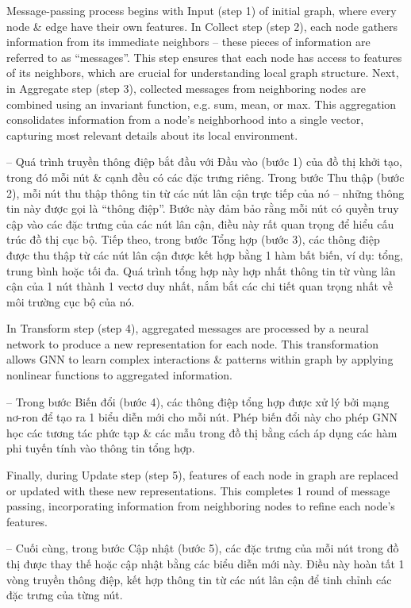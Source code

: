 \documentclass{article}
\begin{document}
\begin{itemize}
\begin{itemize}
\begin{itemize}
            Message-passing process begins with Input (step 1) of initial graph, where every node \& edge have their own features. In Collect step (step 2), each node gathers information from its immediate neighbors -- these pieces of information are referred to as ``messages''. This step ensures that each node has access to features of its neighbors, which are crucial for understanding local graph structure. Next, in Aggregate step (step 3), collected messages from neighboring nodes are combined using an invariant function, e.g. sum, mean, or max. This aggregation consolidates information from a node's neighborhood into a single vector, capturing most relevant details about its local environment.

            -- Quá trình truyền thông điệp bắt đầu với Đầu vào (bước 1) của đồ thị khởi tạo, trong đó mỗi nút \& cạnh đều có các đặc trưng riêng. Trong bước Thu thập (bước 2), mỗi nút thu thập thông tin từ các nút lân cận trực tiếp của nó -- những thông tin này được gọi là ``thông điệp''. Bước này đảm bảo rằng mỗi nút có quyền truy cập vào các đặc trưng của các nút lân cận, điều này rất quan trọng để hiểu cấu trúc đồ thị cục bộ. Tiếp theo, trong bước Tổng hợp (bước 3), các thông điệp được thu thập từ các nút lân cận được kết hợp bằng 1 hàm bất biến, ví dụ: tổng, trung bình hoặc tối đa. Quá trình tổng hợp này hợp nhất thông tin từ vùng lân cận của 1 nút thành 1 vectơ duy nhất, nắm bắt các chi tiết quan trọng nhất về môi trường cục bộ của nó.

            In Transform step (step 4), aggregated messages are processed by a neural network to produce a new representation for each node. This transformation allows GNN to learn complex interactions \& patterns within graph by applying nonlinear functions to aggregated information.

            -- Trong bước Biến đổi (bước 4), các thông điệp tổng hợp được xử lý bởi mạng nơ-ron để tạo ra 1 biểu diễn mới cho mỗi nút. Phép biến đổi này cho phép GNN học các tương tác phức tạp \& các mẫu trong đồ thị bằng cách áp dụng các hàm phi tuyến tính vào thông tin tổng hợp.

            Finally, during Update step (step 5), features of each node in graph are replaced or updated with these new representations. This completes 1 round of message passing, incorporating information from neighboring nodes to refine each node's features.

            -- Cuối cùng, trong bước Cập nhật (bước 5), các đặc trưng của mỗi nút trong đồ thị được thay thế hoặc cập nhật bằng các biểu diễn mới này. Điều này hoàn tất 1 vòng truyền thông điệp, kết hợp thông tin từ các nút lân cận để tinh chỉnh các đặc trưng của từng nút.


\end{itemize}
\end{itemize}
\end{itemize}
\end{document}
